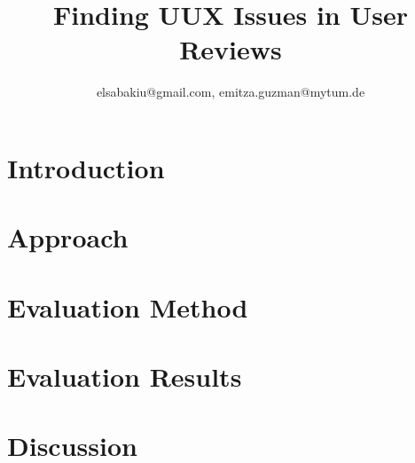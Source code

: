 \documentclass[conference]{IEEEtran}
\begin{document}
                             
                       
\title{Finding UUX Issues in User Reviews}
\author{ 
elsabakiu@gmail.com, emitza.guzman@mytum.de
}        
 
\newcommand{\etal}[0]{{{et al.}\ }}
\newcommand{\ie}[0]{{{i.e.}\ }} 
\maketitle
 
\begin{abstract}




\end{abstract}

         
\IEEEpeerreviewmaketitle  
      
\section{Introduction}  
\label{sec:intro}   
 
      
\section{Approach}     
\label{sec:approach} 
      
         

\section{Evaluation Method}
\label{sec:Evaluation}


\section{Evaluation Results} 
\label{sec:results}




\section{Discussion}
\label{sec:threats}

\end{document}
